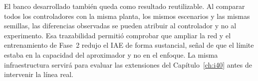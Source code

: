 El banco desarrollado también queda como resultado reutilizable. Al comparar todos los controladores con la misma planta, los mismos escenarios y las mismas semillas, las diferencias observadas se pueden atribuir al controlador y no al experimento. Esa trazabilidad permitió comprobar que ampliar la red y el entrenamiento de Fase~2 redujo el IAE de forma sustancial, señal de que el límite estaba en la capacidad del aproximador y no en el enfoque. La misma infraestructura servirá para evaluar las extensiones del Capítulo~\ref{ch:i40} antes de intervenir la línea real.
